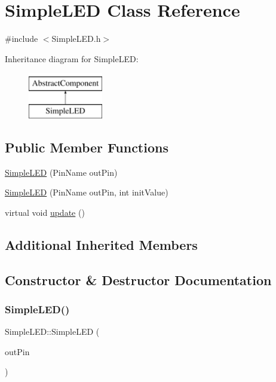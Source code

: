 \hypertarget{class_simple_l_e_d}{}\section{Simple\+L\+ED Class Reference}
\label{class_simple_l_e_d}


{\ttfamily \#include $<$Simple\+L\+E\+D.\+h$>$}

Inheritance diagram for Simple\+L\+ED\+:\begin{figure}[H]
\begin{center}
\leavevmode
\includegraphics[height=2.000000cm]{class_simple_l_e_d}
\end{center}
\end{figure}
\subsection*{Public Member Functions}
\begin{DoxyCompactItemize}
\item 
\hyperlink{class_simple_l_e_d_afec6f532dbc735f2fd95a2d080e7398d}{Simple\+L\+ED} (Pin\+Name out\+Pin)
\item 
\hyperlink{class_simple_l_e_d_a035610e281499c6a1160b2ae6b2797f0}{Simple\+L\+ED} (Pin\+Name out\+Pin, int init\+Value)
\item 
virtual void \hyperlink{class_simple_l_e_d_a1642dc4aca42ad46e5663a39cdda005f}{update} ()
\end{DoxyCompactItemize}
\subsection*{Additional Inherited Members}


\subsection{Constructor \& Destructor Documentation}
\mbox{\label{class_simple_l_e_d_afec6f532dbc735f2fd95a2d080e7398d}} 
\subsubsection{\texorpdfstring{Simple\+L\+E\+D()}{SimpleLED()}\hspace{0.1cm}{\footnotesize\ttfamily [1/2]}}
{\footnotesize\ttfamily Simple\+L\+E\+D\+::\+Simple\+L\+ED (\begin{DoxyParamCaption}\item[{Pin\+Name}]{out\+Pin }\end{DoxyParamCaption})}

